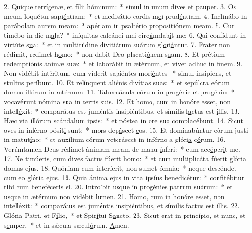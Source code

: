 2. Quique terrígenæ, et fílii h\uline{ó}minum:~* simul in unum d\uline{i}ves et p\uline{au}per.
3. Os meum loquétur sapi\uline{é}ntiam:~* et meditátio cordis m\uline{e}i prud\uline{é}ntiam.
4. Inclinábo in parábolam aurem m\uline{e}am:~* apériam in psaltério propositi\uline{ó}nem m\uline{e}am.
5. Cur timébo in die m\uline{a}la?~* iníquitas calcánei mei circ\uline{ú}mdab\uline{i}t me:
6. Qui confídunt in virtúte s\uline{u}a:~* et in multitúdine divitiárum suárum gl\uline{o}ri\uline{á}ntur.
7. Frater non rédimit, rédimet h\uline{o}mo:~* non dabit Deo placati\uline{ó}nem s\uline{u}am.
8. Et prétium redemptiónis ánimæ s\uline{u}æ:~* et laborábit in ætérnum, et vivet \uline{a}dhuc in f\uline{i}nem.
9. Non vidébit intéritum, cum víderit sapiéntes mori\uline{é}ntes:~* simul insípiens, et st\uline{u}ltus per\uline{í}bunt.
10. Et relínquent aliénis divítias s\uline{u}as:~* et sepúlcra eórum domus illórum \uline{i}n æt\uline{é}rnum.
11. Tabernácula eórum in progénie et prog\uline{é}nie:~* vocavérunt nómina sua in t\uline{e}rris s\uline{u}is.
12. Et homo, cum in honóre esset, non intell\uline{é}xit:~* comparátus est juméntis insipiéntibus, et símilis f\uline{a}ctus est \uline{i}llis.
13. Hæc via illórum scándalum \uline{i}psis:~* et póstea in ore suo c\uline{o}mplac\uline{é}bunt.
14. Sicut oves in inférno pósit\uline{i} sunt:~* mors dep\uline{á}scet \uline{e}os.
15. Et dominabúntur eórum justi in matut\uline{í}no:~* et auxílium eórum veteráscet in inférno a glóri\uline{a} e\uline{ó}rum.
16. Verúmtamen Deus rédimet ánimam meam de manu \uline{í}nferi:~* cum acc\uline{é}per\uline{i}t me.
17. Ne timúeris, cum dives factus fúerit h\uline{o}mo:~* et cum multiplicáta fúerit glória d\uline{o}mus \uline{e}jus.
18. Quóniam cum interíerit, non sumet \uline{ó}mnia:~* neque descéndet cum eo gl\uline{ó}ria \uline{e}jus.
19. Quia ánima ejus in vita ipsíus benedic\uline{é}tur:~* confitébitur tibi cum benef\uline{é}ceris \uline{e}i.
20. Introíbit usque in progénies patrum su\uline{ó}rum:~* et usque in ætérnum non vid\uline{é}bit l\uline{u}men.
21. Homo, cum in honóre esset, non intell\uline{é}xit:~* comparátus est juméntis insipiéntibus, et símilis f\uline{a}ctus est \uline{i}llis.
22. Glória Patri, et F\uline{í}lio,~* et Spir\uline{í}tui S\uline{a}ncto.
23. Sicut erat in princípio, et nunc, et s\uline{e}mper,~* et in sǽcula sæcul\uline{ó}rum. \uline{A}men.
